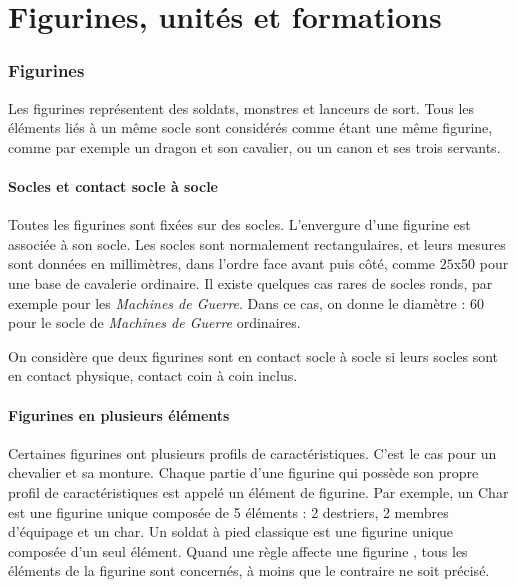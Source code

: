 
\part{Figurines, unités et formations}

\section{Figurines}

Les figurines représentent des soldats, monstres et lanceurs de sort. Tous les éléments liés à un même socle sont considérés comme étant une même figurine, comme par exemple un dragon et son cavalier, ou un canon et ses trois servants.

\subsection{Socles et contact socle à socle}

Toutes les figurines sont fixées sur des socles. L'envergure d'une figurine est associée à son socle. Les socles sont normalement rectangulaires, et leurs mesures sont données en millimètres, dans l'ordre face avant puis côté, comme $ 25 $x\unit{50}{\milli\meter} pour une base de cavalerie ordinaire. Il existe quelques cas rares de socles ronds, par exemple pour les \emph{Machines de Guerre}. Dans ce cas, on donne le diamètre : \unit{60}{\milli\meter} pour le socle de \emph{Machines de Guerre} ordinaires.

On considère que deux figurines sont en contact socle à socle si leurs socles sont en contact physique, contact coin à coin inclus.

\subsection{Figurines en plusieurs éléments}

Certaines figurines ont plusieurs profils de caractéristiques. C'est le cas pour un chevalier et sa monture. Chaque partie d'une figurine qui possède son propre profil de caractéristiques est appelé un élément de figurine. Par exemple, un Char est une figurine unique composée de 5 éléments : 2 destriers, 2 membres d'équipage et un char. Un soldat à pied classique est une figurine unique composée d'un seul élément. Quand une règle affecte une \og figurine \fg , tous les éléments de la figurine sont concernés, à moins que le contraire ne soit précisé.

